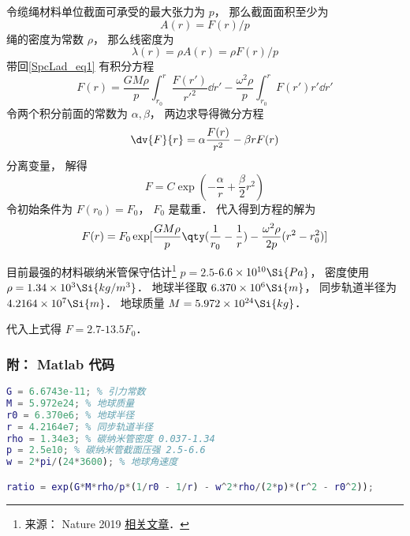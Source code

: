令缆绳材料单位截面可承受的最大张力为 $p$， 那么截面面积至少为
\begin{equation}
A(r) = F(r)/p
\end{equation}
绳的密度为常数 $\rho$， 那么线密度为
\begin{equation}
\lambda(r) = \rho A(r) = \rho F(r)/p
\end{equation}
带回\autoref{SpcLad_eq1} 有积分方程
\begin{equation}
F(r) = \frac{GM\rho}{p} \int_{r_0}^{r} \frac{F(r')}{r'^2} \dd{r'} - \frac{\omega^2\rho}{p}\int_{r_0}^r F(r') r' \dd{r'}
\end{equation}
令两个积分前面的常数为 $\alpha, \beta$， 两边求导得微分方程
\begin{equation}
\dv{F}{r} = \alpha \frac{F(r)}{r^2} - \beta r F(r)
\end{equation}
分离变量， 解得
\begin{equation}
F = C\exp(-\frac{\alpha}{r} + \frac{\beta}{2} r^2)
\end{equation}
令初始条件为 $F(r_0) = F_0$， $F_0$ 是载重． 代入得到方程的解为
\begin{equation}
F(r) = F_0 \exp[\frac{GM\rho}{p} \qty(\frac{1}{r_0} - \frac{1}{r}) - \frac{\omega^2\rho}{2p}(r^2 - r_0^2)]
\end{equation}

目前最强的材料碳纳米管保守估计\footnote{来源： Nature 2019 \href{https://www.nature.com/articles/s41467-019-10959-7}{相关文章}．} $p = 2.5$-$6.6\times 10^{10} \Si{Pa}$， 密度使用 $\rho = 1.34\times 10^{3} \Si{kg/m^3}$． 地球半径取 $6.370\times 10^6\Si{m}$， 同步轨道半径为 $4.2164\times 10^7 \Si{m}$． 地球质量 $M = 5.972 \times 10^{24} \Si{kg}$．

代入上式得 $F = 2.7$-$13.5 F_0$．

\subsubsection{附： Matlab 代码}
\begin{lstlisting}[language=matlab]
G = 6.6743e-11; % 引力常数
M = 5.972e24; % 地球质量
r0 = 6.370e6; % 地球半径
r = 4.2164e7; % 同步轨道半径
rho = 1.34e3; % 碳纳米管密度 0.037-1.34
p = 2.5e10; % 碳纳米管截面压强 2.5-6.6
w = 2*pi/(24*3600); % 地球角速度

ratio = exp(G*M*rho/p*(1/r0 - 1/r) - w^2*rho/(2*p)*(r^2 - r0^2));
\end{lstlisting}
